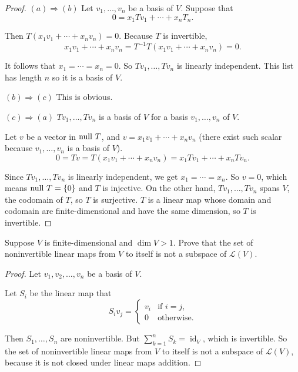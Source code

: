 \begin{proof}
    $(a) \Rightarrow (b)$ Let $v_{1}, \ldots, v_{n}$ be a basis of $V$. Suppose that
    \[
        0 = x_{1}Tv_{1} + \cdots + x_{n}T_{n}.
    \]

    Then $T(x_{1}v_{1} + \cdots + x_{n}v_{n}) = 0$. Because $T$ is invertible,
    \[
        x_{1}v_{1} + \cdots + x_{n}v_{n} = T^{-1}T(x_{1}v_{1} + \cdots + x_{n}v_{n}) = 0.
    \]

    It follows that $x_{1} = \cdots = x_{n} = 0$. So $Tv_{1}, \ldots, Tv_{n}$ is linearly independent. This list has length $n$ so it is a basis of $V$.

    $(b) \Rightarrow (c)$ This is obvious.

    $(c) \Rightarrow (a)$ $Tv_{1}, \ldots, Tv_{n}$ is a basis of $V$ for a basis $v_{1}, \ldots, v_{n}$ of $V$.

    Let $v$ be a vector in $\operatorname{null}\,{T}$, and $v = x_{1}v_{1} + \cdots + x_{n}v_{n}$ (there exist such scalar because $v_{1}, \ldots, v_{n}$ is a basis of $V$).
    \[
        0 = Tv = T(x_{1}v_{1} + \cdots + x_{n}v_{n}) = x_{1}Tv_{1} + \cdots + x_{n}Tv_{n}.
    \]

    Since $Tv_{1}, \ldots, Tv_{n}$ is linearly independent, we get $x_{1} = \cdots = x_{n}$. So $v = 0$, which means $\operatorname{null}\,{T} = \{0\}$ and $T$ is injective. On the other hand, $Tv_{1}, \ldots, Tv_{n}$ spans $V$, the codomain of $T$, so $T$ is surjective. $T$ is a linear map whose domain and codomain are finite-dimensional and have the same dimension, so $T$ is invertible.
\end{proof}
\newpage

\begin{exercise}
    Suppose $V$ is finite-dimensional and $\dim V > 1$. Prove that the set of noninvertible linear maps from $V$ to itself is not a subspace of $\mathcal{L}(V)$.
\end{exercise}

\begin{proof}
    Let $v_{1}, v_{2}, \ldots, v_{n}$ be a basis of $V$.

    Let $S_{i}$ be the linear map that
    \[
        S_{i}v_{j} = \begin{cases}
            v_{i} & \text{if $i = j$}, \\
            0     & \text{otherwise}.
        \end{cases}
    \]

    Then $S_{1}, \ldots, S_{n}$ are noninvertible. But $\sum^{n}_{k=1}S_{k} = \operatorname{id}_{V}$, which is invertible. So the set of noninvertible linear maps from $V$ to itself is not a subspace of $\mathcal{L}(V)$, because it is not closed under linear maps addition.
\end{proof}
\newpage

